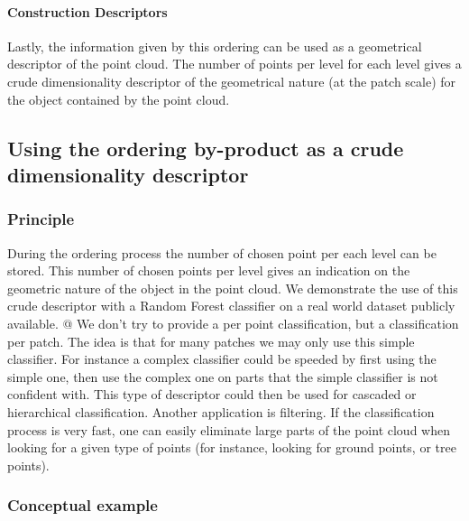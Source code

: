 			\paragraph{Construction Descriptors}
				Lastly, the information given by this ordering can be used as a  geometrical descriptor of the point cloud.
				The number of points per level for each level gives a crude dimensionality descriptor of the geometrical nature (at the patch scale) for the object contained by the point cloud.
				
	\subsection{Using the ordering by-product as a crude dimensionality descriptor}
		\subsubsection{Principle}
			During the ordering process the number of chosen point per each level can be stored.
			This number of chosen points per level gives an indication on the geometric nature of the object in the point cloud. 
			We demonstrate the use of this crude descriptor with a Random Forest classifier on a real world dataset publicly available.
			@
			We don't try to provide a per point classification, but a classification per  patch. 
			The idea is that for many patches we may only use this simple classifier. 
			For instance a complex classifier could be speeded by first using the simple one, then use the complex one on parts that the simple classifier is not confident with.
			This type of descriptor could then be used for cascaded or hierarchical classification. 
			Another application is filtering. If the classification process is very fast, one can easily eliminate large parts of the point cloud when looking for a given type of points (for instance, looking for ground points, or tree points).
		\subsubsection{Conceptual example}
			 
